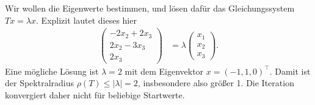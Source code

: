 \documentclass[english, parskip=full]{scrartcl}
\begin{document}
Wir wollen die Eigenwerte bestimmen, und lösen dafür das Gleichungssystem $Tx = \lambda x$.
Explizit lautet dieses hier
\begin{align}
\begin{pmatrix}
-2x_2 + 2x_3 \\ 2x_2 - 3x_3 \\ 2x_3
\end{pmatrix} &= \lambda\begin{pmatrix}
x_1 \\ x_2 \\ x_3
\end{pmatrix}.
\end{align}
Eine mögliche Lösung ist $\lambda = 2$ mit dem Eigenvektor $x = (-1,1,0)^\top$.
Damit ist der Spektralradius $\rho(T) \le |\lambda| = 2$, insbesondere also größer 1.
Die Iteration konvergiert daher nicht für beliebige Startwerte.



    



    
\end{document}

